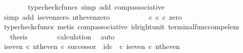 \begin{isabellebody}
\ \ \ \ \ \ \isamarkupfalse%
\ {\isacharparenleft}{\kern0pt}typecheck{\isacharunderscore}{\kern0pt}cfuncs{\isacharcomma}{\kern0pt}\ simp\ add{\isacharcolon}{\kern0pt}\ comp{\isacharunderscore}{\kern0pt}associative{}{\isacharparenright}{\kern0pt}\isanewline
\ \ \ \ \isamarkupfalse%
\ \isamarkupfalse%
\ {\isachardoublequoteopen}{\isachardot}{\kern0pt}{\isachardot}{\kern0pt}{\isachardot}{\kern0pt}\ {\isacharequal}{\kern0pt}\ {\isasymt}{\isachardoublequoteclose}\isanewline
\ \ \ \ \ \ \isamarkupfalse%
\ {\isacharparenleft}{\kern0pt}simp\ add{\isacharcolon}{\kern0pt}\ is{\isacharunderscore}{\kern0pt}even{\isacharunderscore}{\kern0pt}zero\ nth{\isacharunderscore}{\kern0pt}even{\isacharunderscore}{\kern0pt}zero{\isacharparenright}{\kern0pt}\isanewline
\ \ \ \ \isamarkupfalse%
\ \isamarkupfalse%
\ {\isachardoublequoteopen}{\isachardot}{\kern0pt}{\isachardot}{\kern0pt}{\isachardot}{\kern0pt}\ {\isacharequal}{\kern0pt}\ {\isacharparenleft}{\kern0pt}{\isasymt}\ {\isasymcirc}\isactrlsub c\ {\isasymbeta}\isactrlbsub {\isasymnat}\isactrlsub c\isactrlesub {\isacharparenright}{\kern0pt}\ {\isasymcirc}\isactrlsub c\ zero{\isachardoublequoteclose}\isanewline
\ \ \ \ \ \ \isamarkupfalse%
\ {\isacharparenleft}{\kern0pt}typecheck{\isacharunderscore}{\kern0pt}cfuncs{\isacharcomma}{\kern0pt}\ metis\ comp{\isacharunderscore}{\kern0pt}associative{}\ id{\isacharunderscore}{\kern0pt}right{\isacharunderscore}{\kern0pt}unit{}\ terminal{\isacharunderscore}{\kern0pt}func{\isacharunderscore}{\kern0pt}comp{\isacharunderscore}{\kern0pt}elem{\isacharparenright}{\kern0pt}\isanewline
\ \ \ \ \isamarkupfalse%
\ \isamarkupfalse%
\ {\isacharquery}{\kern0pt}thesis\isanewline
\ \ \ \ \ \ \isamarkupfalse%
\ calculation\ \isamarkupfalse%
\ auto\isanewline
\ \ \isamarkupfalse%
\isanewline
\isanewline
\ \ \isamarkupfalse%
\ {\isachardoublequoteopen}{\isacharparenleft}{\kern0pt}is{\isacharunderscore}{\kern0pt}even\ {\isasymcirc}\isactrlsub c\ nth{\isacharunderscore}{\kern0pt}even{\isacharparenright}{\kern0pt}\ {\isasymcirc}\isactrlsub c\ successor\ {\isacharequal}{\kern0pt}\ id\isactrlsub c\ {\isasymOmega}\ {\isasymcirc}\isactrlsub c\ is{\isacharunderscore}{\kern0pt}even\ {\isasymcirc}\isactrlsub c\ nth{\isacharunderscore}{\kern0pt}even{\isachardoublequoteclose}\isanewline
\ \ \isamarkupfalse%
\ {\isacharminus}{\kern0pt}\isanewline
\ \ \ \ \isamarkupfalse%

\end{isabellebody}

